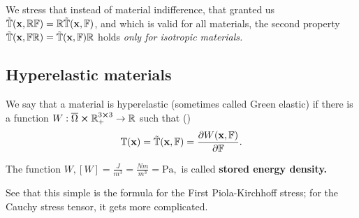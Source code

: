 \documentclass[11pt]{scrartcl} %
\begin{document}
\begin{remark}
    We stress that instead of material indifference, that granted us $\tilde{\mathbb{T}}\qty(\vb{x}, \mathbb{R} \mathbb{F}) = \mathbb{R} \tilde{\mathbb{T}}\qty(\vb{x}, \mathbb{F})$, and which is valid for all materials, the second property $\tilde{\mathbb{T}}\qty(\vb{x}, \mathbb{F} \mathbb{R}) = \tilde{\mathbb{T}}\qty(\vb{x}, \mathbb{F}) \mathbb{R}$ holds \textit{only for isotropic materials.}
\end{remark}

\subsection{Hyperelastic materials}
\label{sec:hyperelasticity}
\begin{definition}
	We say that a material is hyperelastic (sometimes called Green elastic) if there is a function $W:\overline{\Omega} \cross {\mathbb R}^{3 \cross 3}_+ \to {\mathbb R}$ such that (\cite{kruzikElasticMaterials2019})
	\[
		\mathbb{T}\qty(\vb{x}) = \tilde{\mathbb{T}}\qty(\vb{x}, \mathbb{F}) = \pdv{W\qty(\vb{x},\ensuremath{\mathbb{F}})}{\ensuremath{\mathbb{F}}}.
	\]

The function $W, [W] = \frac{J}{m^3} = \frac{N m}{m^3} = \text{Pa},$ is called \textbf{stored energy density.}
\begin{remark}
    See that this simple is the formula for the First Piola-Kirchhoff stress; for the Cauchy stress tensor, it gets more complicated.
\end{remark}
\end{definition}
\end{document}
